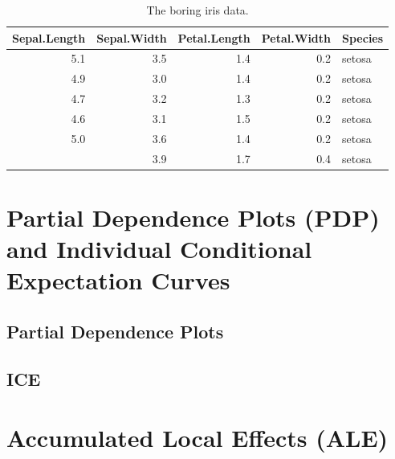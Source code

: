 \documentclass[
]{krantz}
\begin{document}
\begin{table}[t]

\caption{\label{tab:iris}The boring iris data.}
\centering
\begin{tabular}{rrrrl}
\toprule
Sepal.Length & Sepal.Width & Petal.Length & Petal.Width & Species\\
\midrule
5.1 & 3.5 & 1.4 & 0.2 & setosa\\
4.9 & 3.0 & 1.4 & 0.2 & setosa\\
4.7 & 3.2 & 1.3 & 0.2 & setosa\\
4.6 & 3.1 & 1.5 & 0.2 & setosa\\
5.0 & 3.6 & 1.4 & 0.2 & setosa\\
\addlinespace
5.4 & 3.9 & 1.7 & 0.4 & setosa\\
\bottomrule
\end{tabular}
\end{table}

\hypertarget{partial-dependence-plots-pdp-and-individual-conditional-expectation-curves}{%
\chapter{Partial Dependence Plots (PDP) and Individual Conditional Expectation Curves}\label{partial-dependence-plots-pdp-and-individual-conditional-expectation-curves}}

\hypertarget{partial-dependence-plots}{%
\section{Partial Dependence Plots}\label{partial-dependence-plots}}

\hypertarget{ice}{%
\section{ICE}\label{ice}}

\hypertarget{accumulated-local-effects-ale}{%
\chapter{Accumulated Local Effects (ALE)}\label{accumulated-local-effects-ale}}
\end{document}

